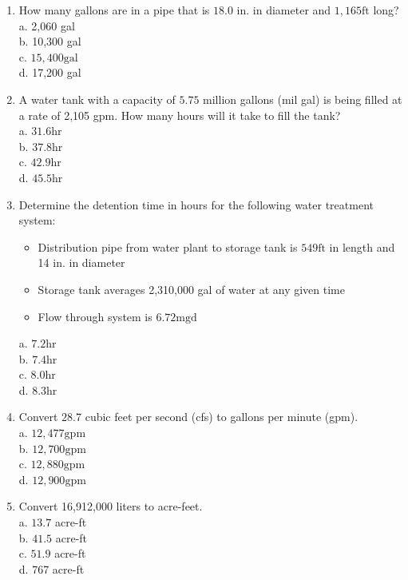 \documentclass[10pt]{article}
\begin{document}
\begin{enumerate}
  \item How many gallons are in a pipe that is $18.0$ in. in diameter and $1,165 \mathrm{ft}$ long?\\
a. 2,060 gal\\
b. 10,300 gal\\
c. $15,400 \mathrm{gal}$\\
d. 17,200 gal 

  \item A water tank with a capacity of $5.75$ million gallons (mil gal) is being filled at a rate of 2,105 gpm. How many hours will it take to fill the tank?\\
a. $31.6 \mathrm{hr}$\\
b. $37.8 \mathrm{hr}$\\
c. $42.9 \mathrm{hr}$\\
d. $45.5 \mathrm{hr}$

  \item Determine the detention time in hours for the following water treatment system:
\begin{itemize}
  \item Distribution pipe from water plant to storage tank is $549 \mathrm{ft}$ in length and 14 in. in diameter

  \item Storage tank averages 2,310,000 gal of water at any given time

  \item Flow through system is $6.72 \mathrm{mgd}$\\
  
  \end{itemize}
a. $7.2 \mathrm{hr}$\\
b. $7.4 \mathrm{hr}$\\
c. $8.0 \mathrm{hr}$\\
d. $8.3 \mathrm{hr}$

  \item Convert $28.7$ cubic feet per second (cfs) to gallons per minute (gpm).\\
a. $12,477 \mathrm{gpm}$\\
b. $12,700 \mathrm{gpm}$\\
c. $12,880 \mathrm{gpm}$\\
d. $12,900 \mathrm{gpm}$

  \item Convert 16,912,000 liters to acre-feet.\\
a. $13.7$ acre-ft\\
b. $41.5$ acre-ft\\
c. $51.9$ acre-ft\\
d. 767 acre-ft


\end{enumerate}
\end{document}

